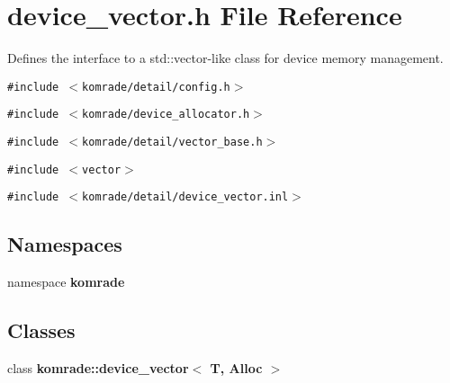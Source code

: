 \section{device\_\-vector.h File Reference}
\label{device__vector_8h}
Defines the interface to a std::vector-like class for device memory management. 

{\tt \#include $<$komrade/detail/config.h$>$}\par
{\tt \#include $<$komrade/device\_\-allocator.h$>$}\par
{\tt \#include $<$komrade/detail/vector\_\-base.h$>$}\par
{\tt \#include $<$vector$>$}\par
{\tt \#include $<$komrade/detail/device\_\-vector.inl$>$}\par
\subsection*{Namespaces}
\begin{CompactItemize}
\item 
namespace {\bf komrade}
\end{CompactItemize}
\subsection*{Classes}
\begin{CompactItemize}
\item 
class {\bf komrade::device\_\-vector$<$ T, Alloc $>$}
\end{CompactItemize}
